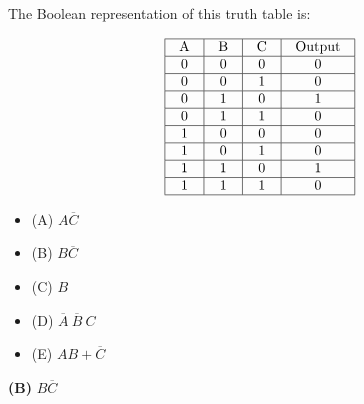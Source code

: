 

The Boolean representation of this truth table is:


$$\vbox{\offinterlineskip
\halign{\strut
\vrule \quad\hfil # \ \hfil & 
\vrule \quad\hfil # \ \hfil & 
\vrule \quad\hfil # \ \hfil & 
\vrule \quad\hfil # \ \hfil \vrule \cr
\noalign{\hrule}
%
A & B & C & Output \cr
%
\noalign{\hrule}
%
0 & 0 & 0 & 0 \cr
%
\noalign{\hrule}
%
0 & 0 & 1 & 0 \cr
%
\noalign{\hrule}
%
0 & 1 & 0 & 1 \cr
%
\noalign{\hrule}
%
0 & 1 & 1 & 0 \cr
%
\noalign{\hrule}
%
1 & 0 & 0 & 0 \cr
%
\noalign{\hrule}
%
1 & 0 & 1 & 0 \cr
%
\noalign{\hrule}
%
1 & 1 & 0 & 1 \cr
%
\noalign{\hrule}
%
1 & 1 & 1 & 0 \cr
%
\noalign{\hrule}
} %
}$$ %

\begin{itemize}
\item{(A)} $A \overline{C}$
\vskip 5pt 
\item{(B)} $B \overline{C}$
\vskip 5pt 
\item{(C)} $B$
\vskip 5pt 
\item{(D)} $\overline{A} \> \overline{B} \> C$
\vskip 5pt 
\item{(E)} $AB + \overline{C}$
\end{itemize}







{\bf (B)} $B \overline{C}$
 










